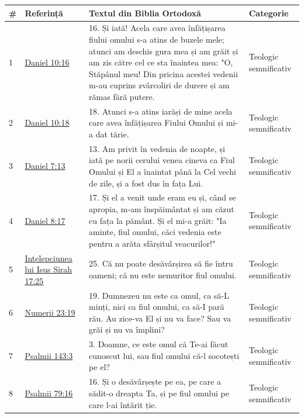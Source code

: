 \documentclass[12pt,a4paper,twoside,openany]{book}
\begin{document}
\small
\begin{longtable}{L{0.8cm}L{1.2cm}L{11.9cm}L{0.8cm}}
\toprule
{}
\textbf{\#} & \textbf{Referință} & \textbf{Textul din Biblia Ortodoxă} & \textbf{Categorie} \\
\midrule
\endhead
{}
1 & \href{https://bibliaortodoxa.ro/carte.php?id=16\&cap=10\#16}{Daniel 10:16} & 16. Și iată! Acela care avea înfățișarea fiului omului s-a atins de buzele mele; atunci am deschis gura mea și am grăit și am zis către cel ce sta înaintea mea: "O, Stăpânul meu! Din pricina acestei vedenii m-au cuprins zvârcoliri de durere și am rămas fără putere. & Teologic semnificativ \\
2 & \href{https://bibliaortodoxa.ro/carte.php?id=16\&cap=10\#18}{Daniel 10:18} & 18. Atunci s-a atins iarăși de mine acela care avea înfățișarea Fiului Omului și mi-a dat tărie. & Teologic semnificativ \\
3 & \href{https://bibliaortodoxa.ro/carte.php?id=16\&cap=7\#13}{Daniel 7:13} & 13. Am privit în vedenia de noapte, și iată pe norii cerului venea cineva ca Fiul Omului și El a înaintat până la Cel vechi de zile, și a fost dus în fața Lui. & Teologic semnificativ \\
4 & \href{https://bibliaortodoxa.ro/carte.php?id=16\&cap=8\#17}{Daniel 8:17} & 17. Și el a venit unde eram eu și, când se apropia, m-am înspăimântat și am căzut cu fața la pământ. Și el mi-a grăit: "Ia aminte, fiul omului, căci vedenia este pentru a arăta sfârșitul veacurilor!" & Teologic semnificativ \\
5 & \href{https://bibliaortodoxa.ro/carte.php?id=72\&cap=17\#25}{Intelepciunea lui Isus Sirah 17:25} & 25. Că nu poate desăvârșirea să fie întru oameni; că nu este nemuritor fiul omului. & Teologic semnificativ \\
6 & \href{https://bibliaortodoxa.ro/carte.php?id=59\&cap=23\#19}{Numerii 23:19} & 19. Dumnezeu nu este ca omul, ca să-L minți, nici ca fiul omului, ca să-I pară rău. Au zice-va El și nu va face? Sau va grăi și nu va împlini? & Teologic semnificativ \\
7 & \href{https://bibliaortodoxa.ro/carte.php?id=65\&cap=143\#3}{Psalmii 143:3} & 3. Doamne, ce este omul că Te-ai făcut cunoscut lui, sau fiul omului că-l socotești pe el? & Teologic semnificativ \\
8 & \href{https://bibliaortodoxa.ro/carte.php?id=65\&cap=79\#16}{Psalmii 79:16} & 16. Și o desăvârșește pe ea, pe care a sădit-o dreapta Ta, și pe fiul omului pe care l-ai întărit ție. & Teologic semnificativ \\

\end{longtable}
\end{document}

